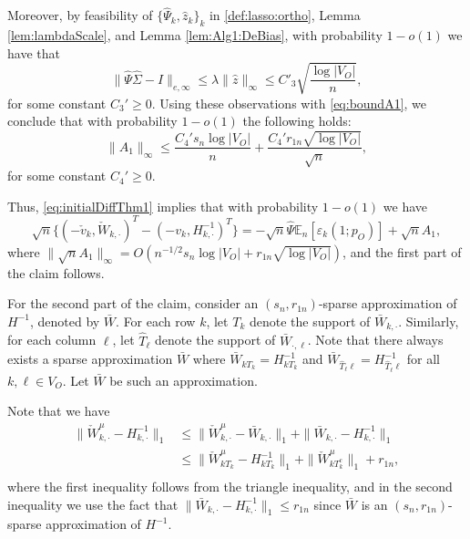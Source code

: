 \documentclass[opre,nonblindrev]{informs3} %
\def\En{{\mathbb{E}_n}}
\def\bWkdot{\bar W_{k,\cdot}}
\begin{document}
\begin{APPENDIX}{}
Moreover, by feasibility of $\{\hat \Psi_k, \hat z_k\}_k$ in \eqref{def:lasso:ortho}, Lemma \ref{lem:lambdaScale}, and Lemma \ref{lem:Alg1:DeBias}, with probability $1-o(1)$ we have that $$\|\hat \Psi \hat\Sigma-I\|_{e,\infty}\leq \lambda \|\hat z \|_\infty \leq C'_3\sqrt{\frac{\log |V_O|}{n}},$$
 for some constant $C_3'\geq 0$.
Using these observations with \eqref{eq:boundA1},
we conclude that
with probability $1-o(1)$ the following holds:
 $$ \|A_1\|_\infty \leq \frac{C_4's_n\log |V_O|}{n} + \frac{C_4' r_{1n}\sqrt{\log |V_O|}}{\sqrt{n}}, $$
for some constant $C_4'\geq 0$.

Thus, \eqref{eq:initialDiffThm1} implies that
with probability $1-o(1)$ we have
\begin{equation}
\label{eq:thm1FirstPart}
	\sqrt{n}\{ (-\check v_k, \check W_{k,\cdot})^T - (-v_k, H^{-1}_{k,\cdot})^T\} =  -\sqrt{n}\hat \Psi\En[\varepsilon_k(1;p_O)] +
	\sqrt{n} A_1,
	\end{equation}	
where
$\|\sqrt{n} A_1 \|_\infty= O(n^{-1/2}s_n\log |V_O| + r_{1n}\sqrt{\log |V_O|})$,
and the first part of the claim follows.	






For the second part of the claim,
consider an $(s_n,r_{1n})$-sparse approximation of $H^{-1}$, denoted by $\bar{W}$.
For each row $k$, let $T_k$ denote the support of $\bar W_{k,\cdot}$.
Similarly, for each column $\ell$, let $\hat{T}_\ell$ denote the support of $\bar W_{\cdot,\ell}$.
Note that there always exists a sparse approximation
 $\bar{W}$
where
$\bar W_{kT_k}= H^{-1}_{kT_k}$
and
$\bar W_{\hat{T}_\ell\ell}= H^{-1}_{\hat{T}_\ell \ell}$
for all $k,\ell \in V_O$. Let $\bar{W}$ be such an approximation.

Note that we have
\begin{equation} \label{eq:Thm1LastBound}
\begin{aligned}
\| \check W_{k,\cdot}^\mu - H_{k,\cdot}^{-1} \|_1 & \leq \| \check W_{k,\cdot}^\mu -
\bWkdot
 \|_1 + \|\bWkdot - H_{k,\cdot}^{-1} \|_1\\
& \leq \| \check W_{k T_k}^\mu - H^{-1}_{kT_k} \|_1 + \| \check W_{k T_k^c}^\mu\|_1 + r_{1n},\\
\end{aligned}
\end{equation}
where
the first inequality follows from the
triangle inequality, and in the second inequality
we use the fact that $\|\bWkdot - H_{k,\cdot}^{-1} \|_1 \leq r_{1n}$ since
$\bar{W}$ is an
$(s_n,r_{1n})$-sparse approximation of $H^{-1}$.


\end{APPENDIX}
\end{document}
